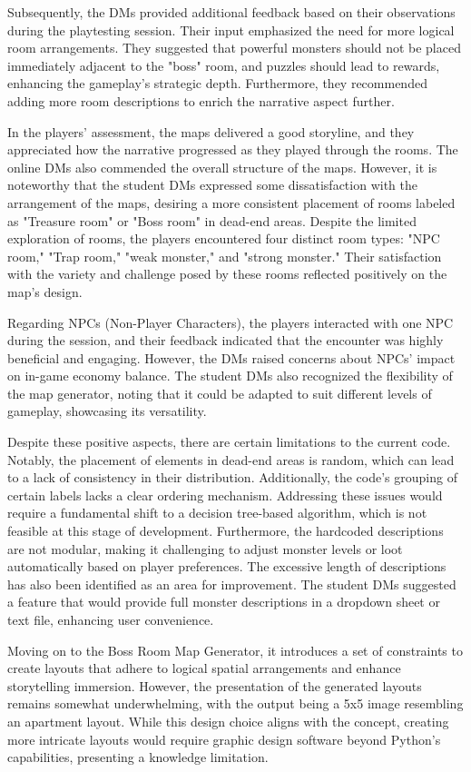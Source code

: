 \documentclass[10pt,twocolumn]{article}
\begin{document}
Subsequently, the DMs provided additional feedback based on their observations during the playtesting session. Their input emphasized the need for more logical room arrangements. They suggested that powerful monsters should not be placed immediately adjacent to the "boss" room, and puzzles should lead to rewards, enhancing the gameplay's strategic depth. Furthermore, they recommended adding more room descriptions to enrich the narrative aspect further.

In the players' assessment, the maps delivered a good storyline, and they appreciated how the narrative progressed as they played through the rooms. The online DMs also commended the overall structure of the maps. However, it is noteworthy that the student DMs expressed some dissatisfaction with the arrangement of the maps, desiring a more consistent placement of rooms labeled as "Treasure room" or "Boss room" in dead-end areas. Despite the limited exploration of rooms, the players encountered four distinct room types: "NPC room," "Trap room," "weak monster," and "strong monster." Their satisfaction with the variety and challenge posed by these rooms reflected positively on the map's design.

Regarding NPCs (Non-Player Characters), the players interacted with one NPC during the session, and their feedback indicated that the encounter was highly beneficial and engaging. However, the DMs raised concerns about NPCs' impact on in-game economy balance. The student DMs also recognized the flexibility of the map generator, noting that it could be adapted to suit different levels of gameplay, showcasing its versatility.

Despite these positive aspects, there are certain limitations to the current code. Notably, the placement of elements in dead-end areas is random, which can lead to a lack of consistency in their distribution. Additionally, the code's grouping of certain labels lacks a clear ordering mechanism. Addressing these issues would require a fundamental shift to a decision tree-based algorithm, which is not feasible at this stage of development. Furthermore, the hardcoded descriptions are not modular, making it challenging to adjust monster levels or loot automatically based on player preferences. The excessive length of descriptions has also been identified as an area for improvement. The student DMs suggested a feature that would provide full monster descriptions in a dropdown sheet or text file, enhancing user convenience.

Moving on to the Boss Room Map Generator, it introduces a set of constraints to create layouts that adhere to logical spatial arrangements and enhance storytelling immersion. However, the presentation of the generated layouts remains somewhat underwhelming, with the output being a 5x5 image resembling an apartment layout. While this design choice aligns with the concept, creating more intricate layouts would require graphic design software beyond Python's capabilities, presenting a knowledge limitation.
\end{document}

